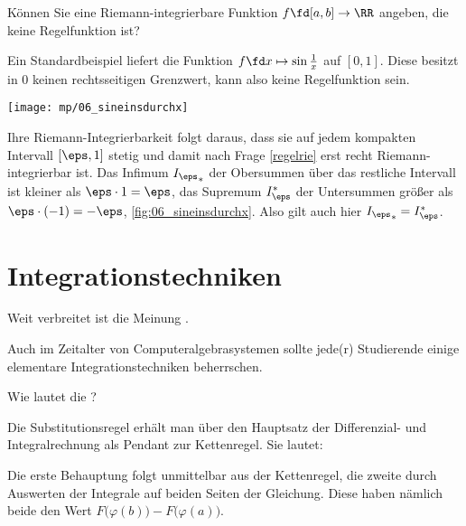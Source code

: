 \begin{frage}\label{06_rire}
Können Sie eine Riemann-integrierbare Funktion 
$f\fd [a,b]\to\RR$ angeben, die keine Regelfunktion ist?
\end{frage}

\begin{antwort}
Ein Standardbeispiel liefert die
Funktion $f\fd x\mapsto \sin \frac{1}{x}$ auf $[0,1]$. 
Diese besitzt in $0$ keinen rechtsseitigen Grenzwert, kann also 
keine Regelfunktion sein.

\begin{center}
  \texttt{[image: mp/06\_sineinsdurchx]}
  \label{fig:06_sineinsdurchx}
\end{center}

Ihre Riemann-Integrierbarkeit folgt daraus, dass sie auf jedem 
kompakten Intervall $[\eps,1]$ stetig und damit nach Frage \ref{regelrie} 
erst recht Riemann-integrierbar ist. 
Das Infimum ${I_\eps}_*$ der Obersummen über das 
restliche Intervall ist kleiner als $\eps\cdot 1=\eps$, 
das Supremum $I^*_\eps$ 
der Untersummen größer als $\eps\cdot (-1)=-\eps$, \sieheAbbildung 
\ref{fig:06_sineinsdurchx}. Also gilt auch hier 
${I_\eps}_* = I_\eps^*$. \AntEnd
\end{antwort}


\section{Integrationstechniken}

Weit verbreitet ist die Meinung .

Auch im Zeitalter von Computeralgebrasystemen sollte jede(r) 
Studierende einige elementare Integrationstechniken beherrschen. 

\begin{frage}
Wie lautet die ?
\end{frage}

\begin{antwort}
Die Substitutionsregel erhält man 
über den Hauptsatz der Differenzial- und Integralrechnung 
als Pendant zur Kettenregel. Sie lautet: 

\medskip
\noindent{}
\noindent
Die erste Behauptung folgt unmittelbar aus der Kettenregel, 
die zweite durch Auswerten der Integrale auf beiden Seiten der 
Gleichung. Diese haben nämlich beide 
den Wert $F\big(\varphi(b)\big)-F\big( \varphi(a) \big)$. 
\AntEnd
\end{antwort}

